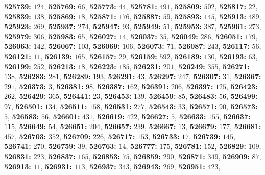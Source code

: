 \textsf{\bfseries 525739:} $124$, \textsf{\bfseries 525769:} $66$, \textsf{\bfseries 525773:} $44$, \textsf{\bfseries 525781:} $491$, \textsf{\bfseries 525809:} $502$, \textsf{\bfseries 525817:} $22$, \textsf{\bfseries 525839:} $138$, \textsf{\bfseries 525869:} $18$, \textsf{\bfseries 525871:} $176$, \textsf{\bfseries 525887:} $59$, \textsf{\bfseries 525893:} $145$, \textsf{\bfseries 525913:} $489$, \textsf{\bfseries 525923:} $269$, \textsf{\bfseries 525937:} $274$, \textsf{\bfseries 525947:} $93$, \textsf{\bfseries 525949:} $51$, \textsf{\bfseries 525953:} $387$, \textsf{\bfseries 525961:} $273$, \textsf{\bfseries 525979:} $306$, \textsf{\bfseries 525983:} $65$, \textsf{\bfseries 526027:} $14$, \textsf{\bfseries 526037:} $35$, \textsf{\bfseries 526049:} $286$, \textsf{\bfseries 526051:} $179$, \textsf{\bfseries 526063:} $142$, \textsf{\bfseries 526067:} $103$, \textsf{\bfseries 526069:} $106$, \textsf{\bfseries 526073:} $71$, \textsf{\bfseries 526087:} $243$, \textsf{\bfseries 526117:} $56$, \textsf{\bfseries 526121:} $11$, \textsf{\bfseries 526139:} $165$, \textsf{\bfseries 526157:} $29$, \textsf{\bfseries 526159:} $592$, \textsf{\bfseries 526189:} $130$, \textsf{\bfseries 526193:} $63$, \textsf{\bfseries 526199:} $252$, \textsf{\bfseries 526213:} $18$, \textsf{\bfseries 526223:} $185$, \textsf{\bfseries 526231:} $201$, \textsf{\bfseries 526249:} $355$, \textsf{\bfseries 526271:} $138$, \textsf{\bfseries 526283:} $281$, \textsf{\bfseries 526289:} $193$, \textsf{\bfseries 526291:} $43$, \textsf{\bfseries 526297:} $247$, \textsf{\bfseries 526307:} $31$, \textsf{\bfseries 526367:} $291$, \textsf{\bfseries 526373:} $3$, \textsf{\bfseries 526381:} $98$, \textsf{\bfseries 526387:} $162$, \textsf{\bfseries 526391:} $206$, \textsf{\bfseries 526397:} $125$, \textsf{\bfseries 526423:} $262$, \textsf{\bfseries 526429:} $365$, \textsf{\bfseries 526441:} $23$, \textsf{\bfseries 526453:} $139$, \textsf{\bfseries 526459:} $85$, \textsf{\bfseries 526483:} $56$, \textsf{\bfseries 526499:} $97$, \textsf{\bfseries 526501:} $134$, \textsf{\bfseries 526511:} $158$, \textsf{\bfseries 526531:} $277$, \textsf{\bfseries 526543:} $33$, \textsf{\bfseries 526571:} $90$, \textsf{\bfseries 526573:} $5$, \textsf{\bfseries 526583:} $56$, \textsf{\bfseries 526601:} $431$, \textsf{\bfseries 526619:} $422$, \textsf{\bfseries 526627:} $5$, \textsf{\bfseries 526633:} $155$, \textsf{\bfseries 526637:} $115$, \textsf{\bfseries 526649:} $54$, \textsf{\bfseries 526651:} $204$, \textsf{\bfseries 526657:} $239$, \textsf{\bfseries 526667:} $13$, \textsf{\bfseries 526679:} $177$, \textsf{\bfseries 526681:} $457$, \textsf{\bfseries 526703:} $352$, \textsf{\bfseries 526709:} $226$, \textsf{\bfseries 526717:} $153$, \textsf{\bfseries 526733:} $17$, \textsf{\bfseries 526739:} $145$, \textsf{\bfseries 526741:} $270$, \textsf{\bfseries 526759:} $39$, \textsf{\bfseries 526763:} $14$, \textsf{\bfseries 526777:} $175$, \textsf{\bfseries 526781:} $152$, \textsf{\bfseries 526829:} $109$, \textsf{\bfseries 526831:} $223$, \textsf{\bfseries 526837:} $165$, \textsf{\bfseries 526853:} $75$, \textsf{\bfseries 526859:} $290$, \textsf{\bfseries 526871:} $349$, \textsf{\bfseries 526909:} $87$, \textsf{\bfseries 526913:} $11$, \textsf{\bfseries 526931:} $113$, \textsf{\bfseries 526937:} $343$, \textsf{\bfseries 526943:} $269$, \textsf{\bfseries 526951:} $423$, 
